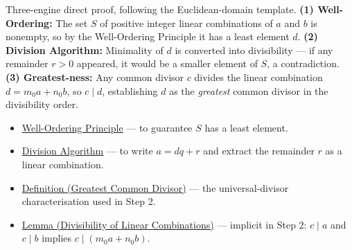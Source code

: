 \begin{remark*}
Three-engine direct proof, following the Euclidean-domain template.
\textbf{(1) Well-Ordering:} The set $S$ of positive integer linear combinations
of $a$ and $b$ is nonempty, so by the Well-Ordering Principle it has a least
element $d$.
\textbf{(2) Division Algorithm:} Minimality of $d$ is converted into divisibility
— if any remainder $r > 0$ appeared, it would be a smaller element of $S$,
a contradiction.
\textbf{(3) Greatest-ness:} Any common divisor $c$ divides the linear combination
$d = m_0 a + n_0 b$, so $c \mid d$, establishing $d$ as the \emph{greatest}
common divisor in the divisibility order.

\end{remark*}

\begin{remark*}[Dependencies]
\begin{itemize}
    \item \hyperref[thm:wop]{Well-Ordering Principle} — to guarantee $S$ has a
          least element.
    \item \hyperref[thm:division-algorithm]{Division Algorithm} — to write
          $a = dq + r$ and extract the remainder $r$ as a linear combination.
    \item \hyperref[def:gcd]{Definition (Greatest Common Divisor)} — the
          universal-divisor characterisation used in Step 2.
    \item \hyperref[lem:div-linear-combo]{Lemma (Divisibility of Linear
          Combinations)} — implicit in Step 2: $c \mid a$ and $c \mid b$
          implies $c \mid (m_0 a + n_0 b)$.
\end{itemize}
\end{remark*}